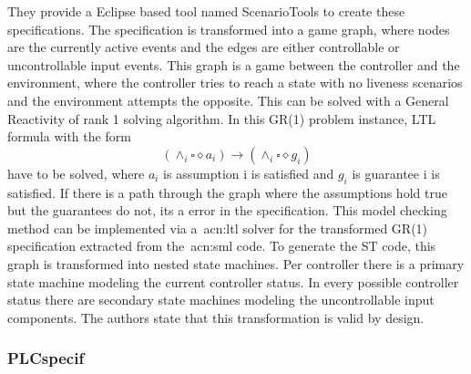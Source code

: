 They provide a Eclipse based tool named ScenarioTools to create these specifications.
The specification is transformed into a game graph, where nodes are the currently active events and the edges are either controllable or uncontrollable input events.
This graph is a game between the controller and the environment, where the controller tries to reach a state with no liveness scenarios and the environment attempts the opposite.
This can be solved with a General Reactivity of rank 1 solving algorithm.
In this GR(1) problem instance, LTL formula with the form
\begin{equation}
\left(\land_{i}\square\diamond a_{i} \right) \rightarrow \left(\land_{i}\square\diamond g_{i} \right)
\end{equation}
have to be solved, where $a_{i}$ is assumption i is satisfied and $g_{i}$ is guarantee i is satisfied.
If there is a path through the graph where the assumptions hold true but the guarantees do not, its a error in the specification.
This model checking method can be implemented via a~\acrshort{acn:ltl} solver for the transformed GR(1) specification extracted from the~\acrshort{acn:sml} code.
To generate the ST code, this graph is transformed into nested state machines.
Per controller there is a primary state machine modeling the current controller status.
In every possible controller status there are secondary state machines modeling the uncontrollable input components.
The authors state that this transformation is valid by design.

\subsubsection{PLCspecif}

